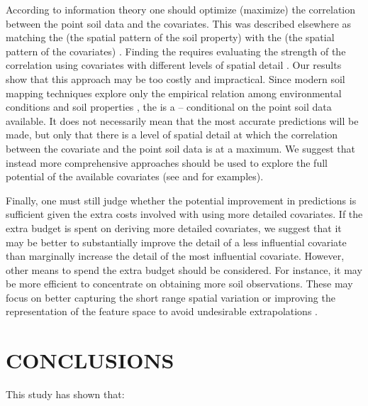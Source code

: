 According to information theory one should optimize (maximize) the correlation between the point soil data and 
the covariates. This was described elsewhere as matching the  (the spatial pattern of the 
soil property) with the  (the spatial pattern of the covariates) \cite{DunganEtAl2002, 
MillerEtAl2014}. Finding the  requires evaluating the strength of the correlation using covariates 
with different levels of spatial detail \cite{DragutEtAl2009, CavazziEtAl2013, MillerEtAl2015}. Our results 
show that this approach may be too costly and impractical. Since modern soil mapping techniques explore only 
the empirical relation among environmental conditions and soil properties \cite{Grunwald2009}, the 
is a  -- conditional on the point soil data available. It does not necessarily mean 
that the most accurate predictions will be made, but only that there is a level of spatial detail at which the 
correlation between the covariate and the point soil data is at a maximum. We suggest that instead more 
comprehensive approaches should be used to explore the full potential of the available covariates (see 
 and  for examples).

Finally, one must still judge whether the potential improvement in predictions is sufficient given the extra 
costs involved with using more detailed covariates. If the extra budget is spent on deriving more detailed 
covariates, we suggest that it may be better to substantially improve the detail of a less influential
covariate than marginally increase the detail of the most influential covariate. However, other means to spend 
the extra budget should be considered. For instance, it may be more efficient to concentrate on obtaining more 
soil observations. These may focus on better capturing the short range spatial variation \cite{BrusEtAl2007a} 
or improving the representation of the feature space to avoid undesirable extrapolations 
\cite{MinasnyEtAl2006b}.

\section{CONCLUSIONS}

This study has shown that:

